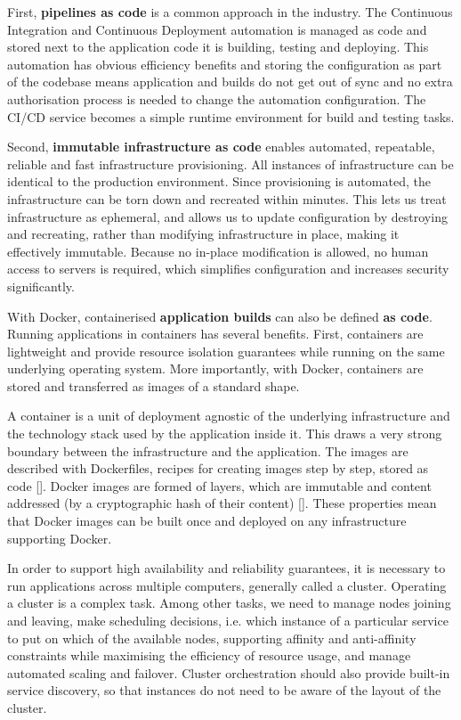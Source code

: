 \documentclass[reprint,amsmath,amssymb,aps]{revtex4-1}
\begin{document}
First, \textbf{pipelines as code} is a common approach in the industry. The Continuous Integration and Continuous Deployment automation is managed as code and stored next to the application code it is building, testing and deploying. This automation has obvious efficiency benefits and storing the configuration as part of the codebase means application and builds do not get out of sync and no extra authorisation process is needed to change the automation configuration. The CI/CD service becomes a simple runtime environment for build and testing tasks.

Second, \textbf{immutable infrastructure as code} enables automated, repeatable, reliable and fast infrastructure provisioning. All instances of infrastructure can be identical to the production environment. Since provisioning is automated, the infrastructure can be torn down and recreated within minutes. This lets us treat infrastructure as ephemeral, and allows us to update configuration by destroying and recreating, rather than modifying infrastructure in place, making it effectively immutable. Because no in-place modification is allowed, no human access to servers is required, which simplifies configuration and increases security significantly.

With Docker, containerised \textbf{application builds} can also be defined \textbf{as code}. Running applications in containers has several benefits. First, containers are lightweight and provide resource isolation guarantees while running on the same underlying operating system. More importantly, with Docker, containers are stored and transferred as images of a standard shape.

A container is a unit of deployment agnostic of the underlying infrastructure and the technology stack used by the application inside it. This draws a very strong boundary between the infrastructure and the application. The images are described with Dockerfiles, recipes for creating images step by step, stored as code []. Docker images are formed of layers, which are immutable and content addressed (by a cryptographic hash of their content) []. These properties mean that Docker images can be built once and deployed on any infrastructure supporting Docker.

In order to support high availability and reliability guarantees, it is necessary to run applications across multiple computers, generally called a cluster. Operating a cluster is a complex task. Among other tasks, we need to manage nodes joining and leaving, make scheduling decisions, i.e. which instance of a particular service to put on which of the available nodes, supporting affinity and anti-affinity constraints while maximising the efficiency of resource usage, and manage automated scaling and failover. Cluster orchestration should also provide built-in service discovery, so that instances do not need to be aware of the layout of the cluster.
\end{document}

